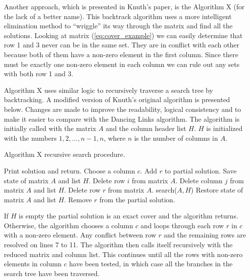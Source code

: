 Another approach, which is presented in Knuth's paper, is the Algorithm X (for the lack of a better name).
This backtrack algorithm uses a more intelligent elimination method to ``wriggle'' its way through the matrix and find all the solutions.
Looking at matrix (\ref{eq:cover_example}) we can easily determine that row 1 and 3 never can be in the same set.
They are in conflict with each other because both of them have a non-zero element in the first column.
Since there must be exactly one non-zero element in each column we can rule out any sets with both row 1 and 3.

Algorithm X uses similar logic to recursively traverse a search tree by backtracking.
A modified version of Knuth's original algorithm is presented below.
Changes are made to improve the readability, logical consistency and to make it easier to compare with the Dancing Links algorithm.
The algorithm is initially called with the matrix $A$ and the column header list $H$.
$H$ is initialized with the numbers $1, 2, \ldots, n-1, n$, where $n$ is the number of columns in $A$.

\begin{algorithm}[H]
	\caption{Algorithm X recursive search procedure.}
	\label{algox_code}
	\begin{distribalgo}[1]
				\STATE Print solution and return.  
			\ENDIF
			\STATE Choose a column $c$.
				\STATE Add $r$ to partial solution.
				\STATE Save state of matrix $A$ and list $H$.
						\STATE Delete row $i$ from matrix $A$.
					\ENDFOR
					\STATE Delete column $j$ from matrix $A$ and list $H$.
				\ENDFOR
				\STATE Delete row $r$ from matrix $A$.
				\STATE search($A,H$)
				\STATE Restore state of matrix $A$ and list $H$.
				\STATE Remove $r$ from the partial solution.
			\ENDFOR
		\ENDPROC
	\end{distribalgo}
\end{algorithm}

If $H$ is empty the partial solution is an exact cover and the algorithm returns.
Otherwise, the algorithm chooses a column $c$ and loops through each row $r$ in $c$ with a non-zero element.
Any conflict between row $r$ and the remaining rows are resolved on lines 7 to 11.
The algorithm then calls itself recursively with the reduced matrix and column list.
This continues until all the rows with non-zero elements in column $c$ have been tested, in which case all the branches in the search tree have been traversed.

